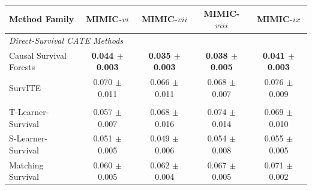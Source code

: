 \documentclass{article} %
\begin{document}
\begin{table}[!ht]
        \begin{subtable}{\linewidth}
        \centering
        \begin{tabular}{lcccc}
        \toprule
        \textbf{Method Family} & \textbf{MIMIC-$vi$} & \textbf{MIMIC-$vii$} & \textbf{MIMIC-$viii$} & \textbf{MIMIC-$ix$} \\
        \midrule
        \multicolumn{5}{l}{\textit{Direct-Survival CATE Methods}} \\
                Causal Survival Forests & \textbf{0.044 $\pm$ 0.003} & \textbf{0.035 $\pm$ 0.003} & \textbf{0.038 $\pm$ 0.005} & \textbf{0.041 $\pm$ 0.003} \\ 
                SurvITE & 0.070 $\pm$ 0.011 & 0.066 $\pm$ 0.011 & 0.068 $\pm$ 0.007 & 0.076 $\pm$ 0.009 \\ 
        \addlinespace
        \multicolumn{5}{l}{\textit{Survival Meta-Learners}} \\
                T-Learner-Survival & 0.057 $\pm$ 0.007 & 0.068 $\pm$ 0.016 & 0.074 $\pm$ 0.014 & 0.069 $\pm$ 0.010 \\ 
                S-Learner-Survival & 0.051 $\pm$ 0.005 & 0.049 $\pm$ 0.006 & 0.054 $\pm$ 0.008 & 0.055 $\pm$ 0.005 \\ 
                Matching Survival & 0.060 $\pm$ 0.005 & 0.062 $\pm$ 0.004 & 0.067 $\pm$ 0.005 & 0.071 $\pm$ 0.002 \\ 
        \bottomrule
        \end{tabular}
        \end{subtable}
\end{table}
\end{document}
